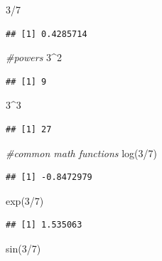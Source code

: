\documentclass[
]{article}
\newenvironment{Shaded}{\begin{snugshade}}{\end{snugshade}}
\newcommand{\CommentTok}[1]{\textcolor[rgb]{0.56,0.35,0.01}{\textit{#1}}}
\newcommand{\DecValTok}[1]{\textcolor[rgb]{0.00,0.00,0.81}{#1}}
\newcommand{\FunctionTok}[1]{\textcolor[rgb]{0.00,0.00,0.00}{#1}}
\newcommand{\NormalTok}[1]{#1}
\newcommand{\SpecialCharTok}[1]{\textcolor[rgb]{0.00,0.00,0.00}{#1}}
\begin{document}
\begin{Shaded}
\begin{Highlighting}[]
\DecValTok{3}\SpecialCharTok{/}\DecValTok{7}
\end{Highlighting}
\end{Shaded}

\begin{verbatim}
## [1] 0.4285714
\end{verbatim}

\begin{Shaded}
\begin{Highlighting}[]
\CommentTok{\#powers}
\DecValTok{3}\SpecialCharTok{\^{}}\DecValTok{2}
\end{Highlighting}
\end{Shaded}

\begin{verbatim}
## [1] 9
\end{verbatim}

\begin{Shaded}
\begin{Highlighting}[]
\DecValTok{3}\SpecialCharTok{\^{}}\DecValTok{3}
\end{Highlighting}
\end{Shaded}

\begin{verbatim}
## [1] 27
\end{verbatim}

\begin{Shaded}
\begin{Highlighting}[]
\CommentTok{\#common math functions}
\FunctionTok{log}\NormalTok{(}\DecValTok{3}\SpecialCharTok{/}\DecValTok{7}\NormalTok{)}
\end{Highlighting}
\end{Shaded}

\begin{verbatim}
## [1] -0.8472979
\end{verbatim}

\begin{Shaded}
\begin{Highlighting}[]
\FunctionTok{exp}\NormalTok{(}\DecValTok{3}\SpecialCharTok{/}\DecValTok{7}\NormalTok{)}
\end{Highlighting}
\end{Shaded}

\begin{verbatim}
## [1] 1.535063
\end{verbatim}

\begin{Shaded}
\begin{Highlighting}[]
\FunctionTok{sin}\NormalTok{(}\DecValTok{3}\SpecialCharTok{/}\DecValTok{7}\NormalTok{)}
\end{Highlighting}
\end{Shaded}
\end{document}
